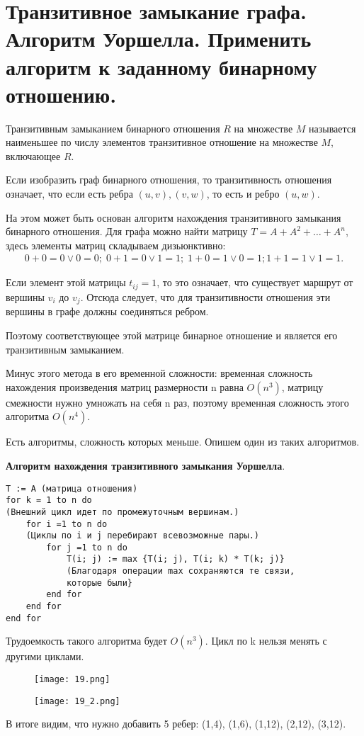 \section{Транзитивное замыкание графа. Алгоритм Уоршелла. Применить алгоритм к заданному 
бинарному отношению.}

\begin{definition}
    Транзитивным замыканием бинарного отношения $R$ на
    множестве $M$ называется наименьшее по числу элементов транзитивное
    отношение на множестве $M$, включающее $R$.
\end{definition}

Если изобразить граф бинарного отношения, то транзитивность отношения
означает, что если есть ребра $(u, v), (v, w)$, то есть и ребро $(u, w)$.

На этом может быть основан алгоритм нахождения транзитивного замыкания
бинарного отношения. Для графа можно найти матрицу $T = A + A^2 + \dots + A^n$,
здесь элементы матриц складываем дизьюнктивно:
\begin{align*}
    0+0=0 \vee 0=0; \; 0+1=0 \vee 1=1; \; 1+0=1 \vee 0=1; 1+1=1 \vee 1=1. 
\end{align*}

Если элемент этой матрицы $t_{ij}=1$, то это означает, что существует маршрут от
вершины $v_i$ до $v_j$. Отсюда следует, что для транзитивности отношения эти
вершины в графе должны соединяться ребром.

Поэтому соответствующее этой матрице бинарное отношение и является его
транзитивным замыканием.

Минус этого метода в его временной сложности: временная сложность
нахождения произведения матриц размерности n равна $O(n^3)$, матрицу
смежности нужно умножать на себя n раз, поэтому временная сложность этого
алгоритма $O(n^4)$.

Есть алгоритмы, сложность которых меньше. Опишем один из таких
алгоритмов.

\newpage
\textbf{Алгоритм нахождения транзитивного замыкания Уоршелла}.
\begin{verbatim}
T := А (матрица отношения)
for k = 1 to n do
(Внешний цикл идет по промежуточным вершинам.)
    for i =1 to n do
    (Циклы по i и j перебирают всевозможные пары.)
        for j =1 to n do
            T(i; j) := max {T(i; j), T(i; k) * T(k; j)}
            (Благодаря операции max сохраняются те связи,
            которые были}
        end for
    end for
end for
\end{verbatim}

Трудоемкость такого алгоритма будет $O(n^3)$. Цикл по k нельзя
менять с другими циклами.

\begin{figure}[h]
    \centering
    \texttt{[image: 19.png]}
\end{figure}
\begin{figure}[h]
    \centering
    \texttt{[image: 19\_2.png]}
\end{figure}

В итоге видим, что нужно добавить 5 ребер: (1,4), (1,6), (1,12), (2,12),
(3,12).